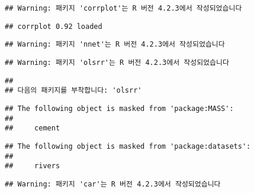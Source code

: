 \documentclass{article}
\begin{document}
\begin{verbatim}
## Warning: 패키지 'corrplot'는 R 버전 4.2.3에서 작성되었습니다
\end{verbatim}

\begin{verbatim}
## corrplot 0.92 loaded
\end{verbatim}

\begin{Shaded}
\begin{Highlighting}[]
\end{Highlighting}
\end{Shaded}

\begin{verbatim}
## Warning: 패키지 'nnet'는 R 버전 4.2.3에서 작성되었습니다
\end{verbatim}

\begin{Shaded}
\begin{Highlighting}[]
\end{Highlighting}
\end{Shaded}

\begin{verbatim}
## Warning: 패키지 'olsrr'는 R 버전 4.2.3에서 작성되었습니다
\end{verbatim}

\begin{verbatim}
## 
## 다음의 패키지를 부착합니다: 'olsrr'
\end{verbatim}

\begin{verbatim}
## The following object is masked from 'package:MASS':
## 
##     cement
\end{verbatim}

\begin{verbatim}
## The following object is masked from 'package:datasets':
## 
##     rivers
\end{verbatim}

\begin{Shaded}
\begin{Highlighting}[]
\end{Highlighting}
\end{Shaded}

\begin{verbatim}
## Warning: 패키지 'car'는 R 버전 4.2.3에서 작성되었습니다
\end{verbatim}
\end{document}

